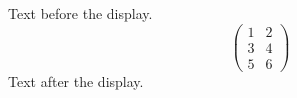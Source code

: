 \documentclass{article}
\begin{document}
Text before the display.
\[
  \begin{pmatrix} 1 & 2 \\ 3 & 4 \\ 5 & 6 \end{pmatrix}
\]
Text after the display.
\end{document}
